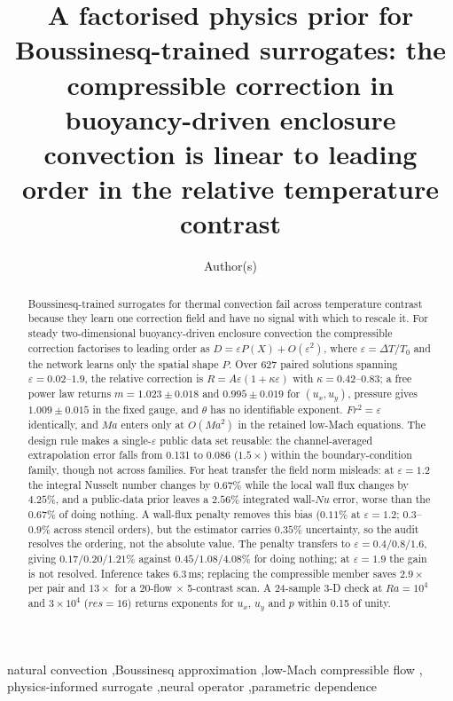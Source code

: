 \documentclass[preprint,11pt,a4paper,times,doubleblind]{elsarticle}
\begin{document}
\begin{frontmatter}

\title{A factorised physics prior for Boussinesq-trained surrogates: the
compressible correction in buoyancy-driven enclosure convection is linear to leading order in the relative
temperature contrast}

\author[a]{Author(s)}
\address[a]{Affiliation(s)}

\begin{abstract}
Boussinesq-trained surrogates for thermal convection fail across temperature contrast because
they learn one correction field and have no signal with which to rescale it. For steady
two-dimensional buoyancy-driven enclosure convection the compressible correction
factorises to leading order as $D=\varepsilon P(X)+O(\varepsilon^2)$, where $\varepsilon=\Delta T/T_0$ and the network learns
only the spatial shape $P$. Over 627 paired solutions spanning $\varepsilon=0.02$--$1.9$, the relative
correction is $R=A\varepsilon(1+\kappa\varepsilon)$ with $\kappa=0.42$--$0.83$; a free power law returns
$m=1.023\pm0.018$ and $0.995\pm0.019$ for $(u_x,u_y)$, pressure gives $1.009\pm0.015$ in the
fixed gauge, and $\theta$ has no identifiable exponent. $Fr^2=\varepsilon$ identically, and $Ma$ enters
only at $O(Ma^2)$ in the retained low-Mach equations. The design rule makes a
single-$\varepsilon$ public data set reusable: the channel-averaged extrapolation error falls from 0.131
to 0.086 ($1.5\times$) within the boundary-condition family, though not across families. For heat transfer the field norm misleads: at
$\varepsilon=1.2$ the integral Nusselt number changes by $0.67\%$ while the local wall flux changes by
$4.25\%$, and a public-data prior leaves a $2.56\%$ integrated wall-$Nu$ error, worse than the
$0.67\%$ of doing nothing. A wall-flux penalty removes this bias ($0.11\%$ at $\varepsilon=1.2$;
$0.3$--$0.9\%$ across stencil orders), but the estimator carries $0.35\%$ uncertainty, so
the audit resolves the ordering, not the absolute value. The penalty transfers to
$\varepsilon=0.4/0.8/1.6$, giving $0.17/0.20/1.21\%$ against $0.45/1.08/4.08\%$ for doing nothing;
at $\varepsilon=1.9$ the gain is not resolved. Inference takes 6.3\,ms; replacing the
compressible member saves $2.9\times$ per pair and $13\times$ for a 20-flow $\times$ 5-contrast scan.
A 24-sample 3-D check at $Ra=10^4$ and $3\times10^4$ ($res=16$) returns exponents for $u_x$, $u_y$
and $p$ within 0.15 of unity.
\end{abstract}

\begin{keyword}
natural convection \sep Boussinesq approximation \sep low-Mach compressible flow \sep
physics-informed surrogate \sep neural operator \sep parametric dependence
\end{keyword}

\end{frontmatter}
\end{document}
